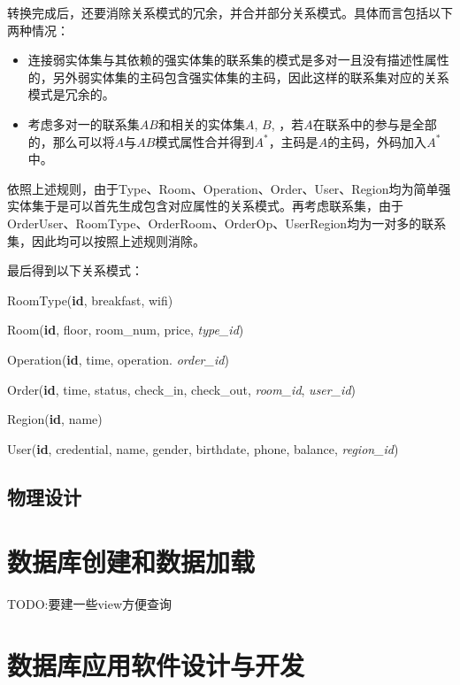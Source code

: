 \documentclass{myreport}
\begin{document}
转换完成后，还要消除关系模式的冗余，并合并部分关系模式。具体而言包括以下两种情况：

\begin{itemize}
	\item 连接弱实体集与其依赖的强实体集的联系集的模式是多对一且没有描述性属性的，另外弱实体集的主码包含强实体集的主码，因此这样的联系集对应的关系模式是冗余的。
	\item 考虑多对一的联系集$AB$和相关的实体集$A$, $B$, ，若$A$在联系中的参与是全部的，那么可以将$A$与$AB$模式属性合并得到$A^*$，主码是$A$的主码，外码加入$A^*$中。
\end{itemize}

依照上述规则，由于Type、Room、Operation、Order、User、Region均为简单强实体集于是可以首先生成包含对应属性的关系模式。再考虑联系集，由于OrderUser、RoomType、OrderRoom、OrderOp、UserRegion均为一对多的联系集，因此均可以按照上述规则消除。

最后得到以下关系模式：

RoomType(\textbf{id}, breakfast, wifi)

Room(\textbf{id}, floor, room\_num, price, \textit{type\_id})

Operation(\textbf{id}, time, operation. \textit{order\_id})

Order(\textbf{id}, time, status, check\_in, check\_out, \textit{room\_id}, \textit{user\_id})

Region(\textbf{id}, name)

User(\textbf{id}, credential, name, gender, birthdate, phone, balance, \textit{region\_id})


\section{物理设计}

\chapter{数据库创建和数据加载}

TODO:要建一些view方便查询

\chapter{数据库应用软件设计与开发}


\end{document}
